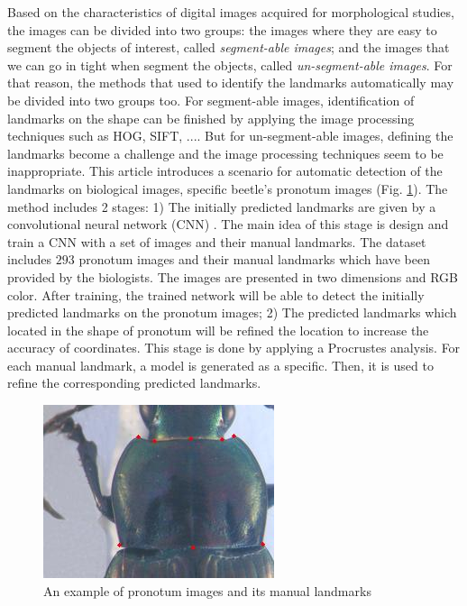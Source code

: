 \documentclass[10pt]{article}
\begin{document}
Based on the characteristics of digital images acquired for morphological studies, the images can be divided into two groups: the images where they are easy to segment the objects of interest, called \textit{segment-able images}; and the images that we can go in tight when segment the objects, called \textit{un-segment-able images}. For that reason, the methods that used to identify the landmarks automatically may be divided into two groups too. For segment-able images, identification of landmarks on the shape can be finished by applying the image processing techniques such as HOG\cite{palaniswamy2010automatic}, SIFT\cite{lowe2004distinctive}, .... But for un-segment-able images, defining the landmarks become a challenge and the image processing techniques seem to be inappropriate. This article introduces a scenario for automatic detection of the landmarks on biological images, specific beetle's pronotum images (Fig. \ref{figpronotum}). The method includes 2 stages: 1) The initially predicted landmarks are given by a convolutional neural network (CNN) \cite{lecun2010convolutional}. The main idea of this stage is design and train a CNN with a set of images and their manual landmarks. The dataset includes $293$ pronotum images and their manual landmarks which have been provided by the biologists. The images are presented in two dimensions and RGB color. After training, the trained network will be able to detect the initially predicted landmarks on the pronotum images; 2) The predicted landmarks which located in the shape of pronotum will be refined the location to increase the accuracy of coordinates. This stage is done by applying a Procrustes analysis\cite{gower1975generalized}. For each manual landmark, a model is generated as a specific. Then, it is used to refine the corresponding predicted landmarks.

\begin{figure}[htbp]
\centering
	\centerline{\includegraphics[scale=0.75]{images/pronotum}}
	\caption{An example of pronotum images and its manual landmarks}
	\label{figpronotum}
\end{figure}
\end{document}

